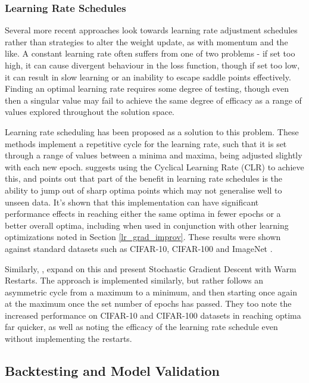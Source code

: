 \documentclass[a4paper,11pt,oneside]{article}
\theoremstyle{plain}
\theoremstyle{definition}
\begin{document}
	
	
	\subsubsection{Learning Rate Schedules}
	
	Several more recent approaches look towards learning rate adjustment schedules rather than strategies to alter the 
	weight update, as with momentum and the like. A constant learning rate often suffers from one of two problems - 
	if set too high, it can cause divergent behaviour in the loss function, though if set too low, it can result in slow 
	learning or an inability to escape saddle points effectively. Finding an optimal learning rate requires some degree
	of testing, though even then a singular value may fail to achieve the same degree of efficacy as a range of values 
	explored throughout the solution space. \newline
	
	Learning rate scheduling has been proposed as a solution to this problem. These methods implement a repetitive cycle 
	for the learning rate, such that it is set through a range of values between a minima and maxima, being adjusted slightly 
	with each new epoch. \citet{Smith} suggests using the Cyclical Learning Rate (CLR) to achieve this, and points out that part of the benefit 
	in learning rate schedules is the ability to jump out of sharp optima points which may not generalise well to unseen data. 
	It's shown that this implementation can have significant performance effects in reaching either the same optima in fewer epochs or a better 
	overall optima, including when used in conjunction with other learning optimizations noted in Section \ref{lr_grad_improv}. These results were 
	shown against standard datasets such as CIFAR-10, CIFAR-100 and ImageNet \citep{Smith}. \newline
	
	Similarly, \citet{Loshchilov}, expand on this and present Stochastic Gradient Descent with Warm Restarts. The approach is 
	implemented similarly, but rather follows an asymmetric cycle from a maximum to a minimum, and then starting once again at the maximum once the set number 
	of epochs has passed. They too note the increased performance on CIFAR-10 and CIFAR-100 datasets in reaching optima far quicker, as well as noting the efficacy of the 
	learning rate schedule even without implementing the restarts.
	
	
	
	\subsection{Backtesting and Model Validation} \label{lr_backtesting}
	\hfill
	
\end{document}
